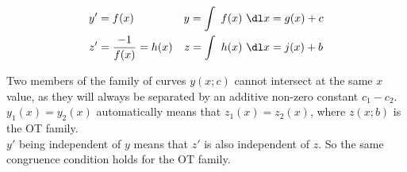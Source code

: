 \begin{enumerate}
          \begin{align}
              y' & = f(x)                   & y = \int\ f(x)\ \dl x & = g(x) + c \\
              z' & = \frac{-1}{f(x)} = h(x) & z = \int\ h(x)\ \dl x & = j(x) + b
          \end{align}

          Two members of the family of curves $ y(x;c) $ cannot intersect at the same $ x $ value,
          as they will always be separated by an additive non-zero constant $ c_{1} - c_{2} $.\\
          $ y_{1}(x) = y_{2}(x) $ automatically means that $ z_{1}(x) = z_{2}(x) $, where
          $ z(x;b) $ is the OT family. \\
          $ y' $ being independent of $ y $ means that $ z' $ is also independent of $ z $. So
          the same congruence condition holds for the OT family.
\end{enumerate}